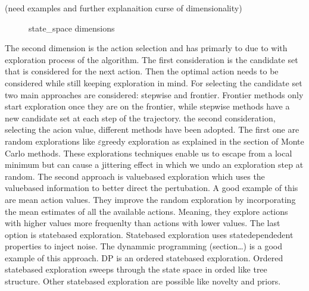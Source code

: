 \documentclass[letterpaper,10pt,english]{jupyterBook}
\let\sphinxpxdimen\pdfpxdimen\else\newdimen\sphinxpxdimen
\begin{document}
\sphinxAtStartPar
(need examples and further explanaition curse of dimensionality)

\begin{figure}[htbp]
\centering
\capstart

\noindent\sphinxincludegraphics[width=500\sphinxpxdimen,height=350\sphinxpxdimen]{{state_space}.png}
\caption{state\_space dimensions}\label{\detokenize{Reinforcement_learning:state-space-fig}}\end{figure}

\sphinxAtStartPar
The second dimension is the action selection and has primarly to due to with exploration process of the algorithm. The first consideration is the candidate set that is considered for the next action. Then the optimal action needs to be considered while still keeping exploration in mind. For selecting the candidate set two main approaches are considered: step\sphinxhyphen{}wise and frontier. Frontier methods only start exploration once they are on the frontier, while step\sphinxhyphen{}wise methods have a new candidate set at each step of the trajectory. the second consideration, selecting the acion value,  different methods have been adopted. The first one are random explorations like \(\varepsilon\)\sphinxhyphen{}greedy exploration as explained in the section of Monte Carlo methods. These explorations techniques enable us to escape from a local minimum but can cause a jittering effect in which we undo an exploration step at random. The second approach is value\sphinxhyphen{}based exploration which uses the value\sphinxhyphen{}based information to better direct the pertubation. A good example of this are mean action values. They improve the random exploration by incorporating the mean estimates of all the available actions. Meaning, they explore actions with higher values more frequenlty than actions with lower values. The last option is state\sphinxhyphen{}based exploration. State\sphinxhyphen{}based exploration uses state\sphinxhyphen{}dependedent properties to inject noise. The dynammic programming (section…) is a good example of this approach. DP is an ordered state\sphinxhyphen{}based exploration. Ordered state\sphinxhyphen{}based exploration sweeps through the state space in orded like tree structure. Other state\sphinxhyphen{}based exploration are possible like novelty and priors.
\end{document}

